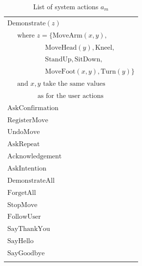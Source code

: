 \begin{table}[h]
\begin{minipage}[b]{80mm}
\begin{footnotesize}
\begin{tabular}{p{60mm}}
$\mathrm{Demonstrate}(z)$ \\ $\ \ \ \ \ \text { where } z = \{\mathrm{MoveArm}(x,y), $ \\ $\ \ \ \ \ \ \ \ \ \ \ \ \ \ \ \ \ \ \ \ \ \ \ \ \  \mathrm{MoveHead}(y),\mathrm{Kneel}, $ \\ $\ \ \ \ \ \ \ \ \ \ \ \ \ \ \ \ \ \ \ \ \ \ \ \ \  \mathrm{StandUp},\mathrm{SitDown}, $ \\ $\ \ \ \ \ \ \ \ \ \ \ \ \ \ \ \ \ \ \ \ \ \ \ \ \  \mathrm{MoveFoot}(x,y), \mathrm{Turn}(y)\}$ \\ $\ \ \ \ \ \text{ and } x, y \text{ take the same values}$ \\ $\ \ \ \ \ \ \ \ \ \ \ \ \ \ \ \ \ \ \ \ \text{as for the user actions}$ \\[0.5mm] \hdashline \vspace{-2.5mm} 
$\mathrm{AskConfirmation}$ \\[0.5mm] \hdashline \vspace{-2.5mm} 
$\mathrm{RegisterMove}$ \\[0.5mm] \hdashline \vspace{-2.5mm} 
$\mathrm{UndoMove}$ \\[0.5mm] \hdashline \vspace{-2.5mm} 
$\mathrm{AskRepeat}$ \\[0.5mm] \hdashline \vspace{-2.5mm} 
$\mathrm{Acknowledgement}$ \\[0.5mm] \hdashline \vspace{-2.5mm} 
$\mathrm{AskIntention}$ \\[0.5mm] \hdashline \vspace{-2.5mm} 
$\mathrm{DemonstrateAll}$ \\[0.5mm] \hdashline \vspace{-2.5mm} 
$\mathrm{ForgetAll}$ \\[0.5mm] \hdashline \vspace{-2.5mm} 
$\mathrm{StopMove}$ \\[0.5mm] \hdashline \vspace{-2.5mm} 
$\mathrm{FollowUser}$ \\[0.5mm] \hdashline \vspace{-2.5mm} 
$\mathrm{SayThankYou}$ \\[0.5mm] \hdashline \vspace{-2.5mm} 
$\mathrm{SayHello}$ \\[0.5mm] \hdashline \vspace{-2.5mm} 
$\mathrm{SayGoodbye}$  \\[0.5mm] \hdashline 
\end{tabular}
\end{footnotesize}
\caption{List of system actions $a_m$} 
\label{table:systemdas}
\end{minipage}
\end{table}

